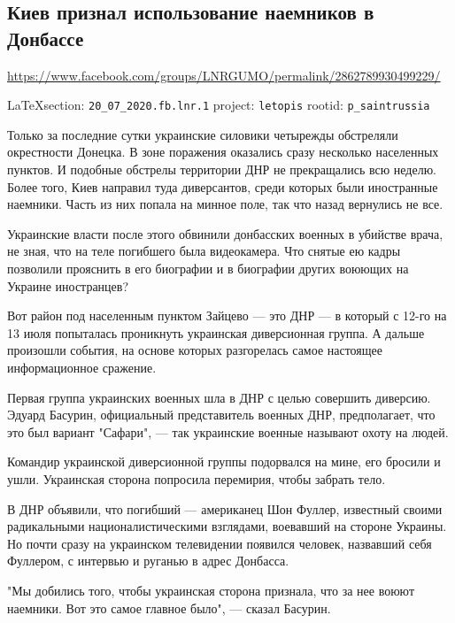  
 
\subsection{Киев признал использование наемников в Донбассе}
\url{https://www.facebook.com/groups/LNRGUMO/permalink/2862789930499229/}
  
\vspace{0.5cm}
{\small\LaTeX section: \verb|20_07_2020.fb.lnr.1| project: \verb|letopis| rootid: \verb|p_saintrussia|}
\vspace{0.5cm}

Только за последние сутки украинские силовики четырежды обстреляли окрестности
Донецка. В зоне поражения оказались сразу несколько населенных пунктов. И
подобные обстрелы территории ДНР не прекращались всю неделю. Более того, Киев
направил туда диверсантов, среди которых были иностранные наемники. Часть из
них попала на минное поле, так что назад вернулись не все. 

Украинские власти после этого обвинили донбасских военных в убийстве врача, не
зная, что на теле погибшего была видеокамера. Что снятые ею кадры позволили
прояснить в его биографии и в биографии других воюющих на Украине иностранцев?

Вот район под населенным пунктом Зайцево --- это ДНР --- в который с 12-го на 13
июля попыталась проникнуть украинская диверсионная группа. А дальше произошли
события, на основе которых разгорелась самое настоящее информационное сражение.

Первая группа украинских военных шла в ДНР с целью совершить диверсию. Эдуард
Басурин, официальный представитель военных ДНР, предполагает, что это был
вариант "Сафари", --- так украинские военные называют охоту на людей.

Командир украинской диверсионной группы подорвался на мине, его бросили и ушли.
Украинская сторона попросила перемирия, чтобы забрать тело.

В ДНР объявили, что погибший --- американец Шон Фуллер, известный своими
радикальными националистическими взглядами, воевавший на стороне Украины. Но
почти сразу на украинском телевидении появился человек, назвавший себя
Фуллером, с интервью и руганью в адрес Донбасса.

"Мы добились того, чтобы украинская сторона признала, что за нее воюют
наемники. Вот это самое главное было", --- сказал Басурин.

